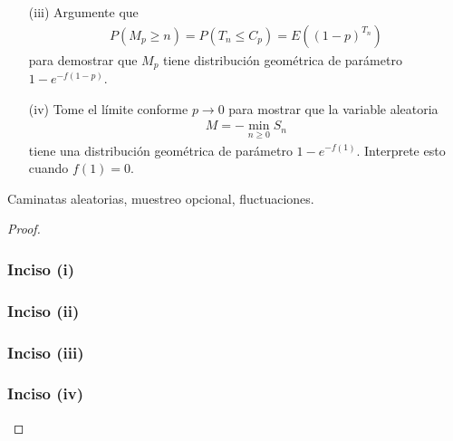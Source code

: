 \begin{problema}
\begin{enumerate}
		\item[(iii)] 
					Argumente que
					\begin{align}
						P(M_p\geq n)=P(T_n\leq C_p)=E((1-p)^{T_n})
					\end{align}
					para demostrar que $M_p$ tiene distribuci\'on geom\'etrica de par\'ametro $1-e^{-f(1-p)}$.
					
		\item[(iv)] 
					Tome el límite conforme $p\to 0$ para mostrar que la variable aleatoria 
					\begin{align}
						M=-\min_{n\geq 0}S_n
					\end{align}
					tiene una distribuci\'on geom\'etrica de par\'ametro $1-e^{-f(1)}$. Interprete esto cuando $f(1)=0$.
	\end{enumerate}

		 Caminatas aleatorias, muestreo opcional, fluctuaciones.
\end{problema}


\begin{proof}
	\subsubsection{Inciso (i)} 
	
	\newpage
	
	\subsubsection{Inciso (ii)} 
	
	\newpage
		
	\subsubsection{Inciso (iii)}
	
	\newpage
	
	\subsubsection{Inciso (iv)} 
	
\end{proof}